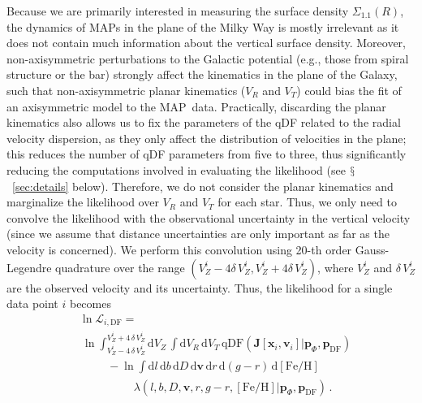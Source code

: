 \documentclass{emulateapj}
\newcommand{\dd}{\mathrm{d}}
\newcommand{\eg}{e.g.}
\newcommand{\sectionname}{$\mathsection$}
\newcommand{\feh}{\ensuremath{[\mathrm{Fe/H}]}}
\renewcommand{\vec}[1]{\ensuremath{\mathbf{#1}}}
\newcommand{\vecx}{\ensuremath{\vec{x}}}
\newcommand{\vecv}{\ensuremath{\vec{v}}}
\newcommand{\vecj}{\ensuremath{\vec{J}}}
\newcommand{\qdf}{\ensuremath{\mathrm{qDF}}}
\newcommand{\paramsdf}{\ensuremath{\vec{p}_{\mathrm{DF}}}}
\newcommand{\paramspot}{\ensuremath{\vec{p}_\Phi}}
\newcommand{\map}{MAP}
\newcommand{\sigoneone}{\ensuremath{\Sigma_{1.1}}}
\begin{document}
Because we are primarily interested in measuring the surface density
$\sigoneone(R)$, the dynamics of \map s in the plane of the Milky Way
is mostly irrelevant as it does not contain much information about the
vertical surface density. Moreover, non-axisymmetric perturbations to
the Galactic potential (\eg, those from spiral structure or the bar)
strongly affect the kinematics in the plane of the Galaxy, such that
non-axisymmetric planar kinematics ($V_R$ and $V_T$) could bias the
fit of an axisymmetric model to the \map\ data. Practically,
discarding the planar kinematics also allows us to fix the parameters
of the qDF related to the radial velocity dispersion, as they only
affect the distribution of velocities in the plane; this reduces the
number of qDF parameters from five to three, thus significantly
reducing the computations involved in evaluating the likelihood (see
\sectionname~\ref{sec:details} below). Therefore, we do not consider
the planar kinematics and marginalize the likelihood over $V_R$ and
$V_T$ for each star. Thus, we only need to convolve the likelihood
with the observational uncertainty in the vertical velocity (since we
assume that distance uncertainties are only important as far as the
velocity is concerned). We perform this convolution using 20-th order
Gauss-Legendre quadrature over the range
$(V^i_Z-4\delta\,V^i_Z,V^i_Z+4\delta\,V^i_Z)$, where $V^i_Z$ and
$\delta\,V^i_Z$ are the observed velocity and its uncertainty. Thus,
the likelihood for a single data point $i$ becomes
\begin{equation}\label{eq:dflike2}
\begin{split}
  & \ln \mathcal{L}_{i,\mathrm{DF}} = \\
  & \ \ln
    \int_{V^i_Z-4\,\delta\,V^i_Z}^{V^i_Z+4\,\delta\,V^i_Z}\dd V_Z\,
    \int \dd V_R \,\dd V_T\,
    \qdf(\vecj[\vecx_i,\vecv_i]|\paramspot,\paramsdf)\\
    & \qquad \ \   -\ln \int
    \dd l \,\dd b\, \dd D\, \dd \vecv\,\dd r\, \dd (g-r) \,\dd\feh\\
    & \qquad \ \ \qquad \,\,\lambda(l,b,D,\vecv,r,g-r,\feh|\paramspot,\paramsdf)\,.
\end{split}
\end{equation}
\end{document}
